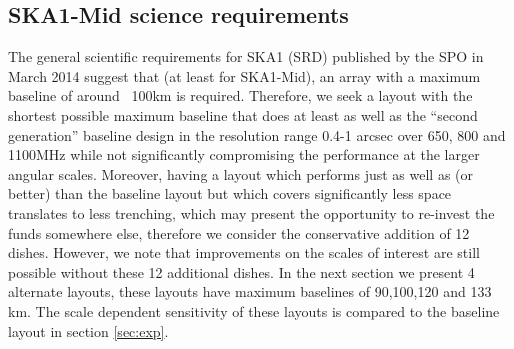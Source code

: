 \documentclass[sfheadings,a4paper,10pt,floats,floatfix]{article}
\begin{document}
\subsection{SKA1-Mid science requirements}\label{sec:sci-req}
The general scientific requirements for SKA1\cite{srd} (SRD) published by the SPO in March 2014 suggest that (at least for
SKA1-Mid), an array with a maximum baseline of around ~100km is required.
Therefore, we seek a layout with the shortest possible maximum baseline that does at least as well as the
``second generation'' baseline design in the resolution range 0.4-1 arcsec over 650, 800 and 1100MHz while not significantly
compromising the performance at the larger angular scales. Moreover, having a layout which performs just as well as (or better)
than the baseline layout but which covers significantly less space translates to less trenching, which may present the opportunity
to re-invest the funds somewhere else, therefore we consider the conservative addition of 12 dishes. However, we note that
improvements on the scales of interest are still possible without these 12 additional dishes. In the next section we present 4
alternate layouts, these layouts have maximum baselines of 90,100,120 and 133 km. The scale dependent sensitivity of these layouts
is compared to the baseline layout in section \ref{sec:exp}.
\end{document}
